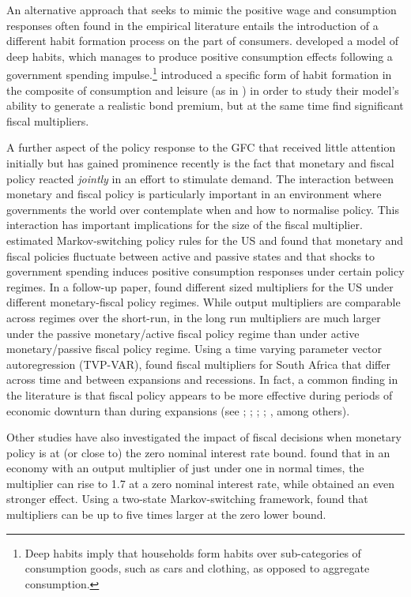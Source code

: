 \documentclass[a4paper,11pt]{article}
\numberwithin{equation}{section}
\begin{document}
	An alternative approach that seeks to mimic the positive wage and consumption responses often found in the empirical literature entails the introduction of a different habit formation process on the part of consumers. \cite{ravn2010} developed a model of deep habits, which manages to produce positive consumption effects following a government spending impulse.\footnote{Deep habits imply that households form habits over sub-categories of consumption goods, such as cars and clothing, as opposed to aggregate consumption.}  \cite{christoffel2011} introduced a specific form of habit formation in the composite of consumption and leisure (as in \citealp{jaccard2010}) in order to study their model's ability to generate a realistic bond premium, but at the same time find significant fiscal multipliers. 
	
	A further aspect of the policy response to the GFC that received little attention initially but has gained prominence recently is the fact that monetary and fiscal policy reacted \textit{jointly} in an effort to stimulate demand. The interaction between monetary and fiscal policy is particularly important in an environment where governments the world over contemplate when and how to normalise policy. This interaction has important implications for the size of the fiscal multiplier. \cite{davig} estimated Markov-switching policy rules for the US and found that monetary and fiscal policies fluctuate between active and passive states and that shocks to government spending induces positive consumption responses under certain policy regimes. In a follow-up paper, \cite{leeper2015} found different sized multipliers for the US under different monetary-fiscal policy regimes. While output multipliers are comparable across regimes over the short-run, in the long run multipliers are much larger under the passive monetary/active fiscal policy regime than under active monetary/passive fiscal policy regime. Using a time varying parameter vector autoregression (TVP-VAR), \cite{jooste} found fiscal multipliers for South Africa that differ across time and between expansions and recessions. In fact, a common finding in the literature is that fiscal policy appears to be more effective during periods of economic downturn than during expansions (see \citealp{auerbach}; \citealp{baum2012}; \citealp{owyang2013}; \citealp{auerbach2014}; \citealp{canzoneri2015}, among others). 
	
	Other studies have also investigated the impact of fiscal decisions when monetary policy is at (or close to) the zero nominal interest rate bound. \cite{hall} found that in an economy with an output multiplier of just under one in normal times, the multiplier can rise to 1.7 at a zero nominal interest rate, while \cite{christiano2011} obtained an even stronger effect. Using a two-state Markov-switching framework, \cite{eggertsson2011} found that multipliers can be up to five times larger at the zero lower bound.
	
\end{document}
